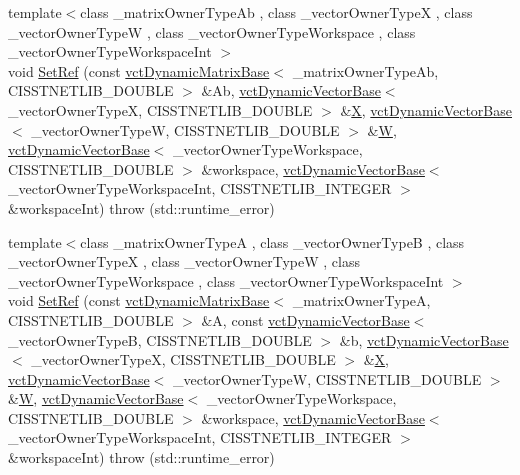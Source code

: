 {\bf }\par
\begin{DoxyCompactItemize}
\item 
{\footnotesize template$<$class \+\_\+matrix\+Owner\+Type\+Ab , class \+\_\+vector\+Owner\+Type\+X , class \+\_\+vector\+Owner\+Type\+W , class \+\_\+vector\+Owner\+Type\+Workspace , class \+\_\+vector\+Owner\+Type\+Workspace\+Int $>$ }\\void \hyperlink{classnmr_n_n_l_s_dynamic_data_ab32c899922b96030616bf83d5e741c55}{Set\+Ref} (const \hyperlink{classvct_dynamic_matrix_base}{vct\+Dynamic\+Matrix\+Base}$<$ \+\_\+matrix\+Owner\+Type\+Ab, C\+I\+S\+S\+T\+N\+E\+T\+L\+I\+B\+\_\+\+D\+O\+U\+B\+L\+E $>$ \&Ab, \hyperlink{classvct_dynamic_vector_base}{vct\+Dynamic\+Vector\+Base}$<$ \+\_\+vector\+Owner\+Type\+X, C\+I\+S\+S\+T\+N\+E\+T\+L\+I\+B\+\_\+\+D\+O\+U\+B\+L\+E $>$ \&\hyperlink{classnmr_n_n_l_s_dynamic_data_a2c67d4c5f9eff20ae015e60f85718f02}{X}, \hyperlink{classvct_dynamic_vector_base}{vct\+Dynamic\+Vector\+Base}$<$ \+\_\+vector\+Owner\+Type\+W, C\+I\+S\+S\+T\+N\+E\+T\+L\+I\+B\+\_\+\+D\+O\+U\+B\+L\+E $>$ \&\hyperlink{classnmr_n_n_l_s_dynamic_data_ae3204dc027313115b092088253dc4bb0}{W}, \hyperlink{classvct_dynamic_vector_base}{vct\+Dynamic\+Vector\+Base}$<$ \+\_\+vector\+Owner\+Type\+Workspace, C\+I\+S\+S\+T\+N\+E\+T\+L\+I\+B\+\_\+\+D\+O\+U\+B\+L\+E $>$ \&workspace, \hyperlink{classvct_dynamic_vector_base}{vct\+Dynamic\+Vector\+Base}$<$ \+\_\+vector\+Owner\+Type\+Workspace\+Int, C\+I\+S\+S\+T\+N\+E\+T\+L\+I\+B\+\_\+\+I\+N\+T\+E\+G\+E\+R $>$ \&workspace\+Int)  throw (std\+::runtime\+\_\+error)
\item 
{\footnotesize template$<$class \+\_\+matrix\+Owner\+Type\+A , class \+\_\+vector\+Owner\+Type\+B , class \+\_\+vector\+Owner\+Type\+X , class \+\_\+vector\+Owner\+Type\+W , class \+\_\+vector\+Owner\+Type\+Workspace , class \+\_\+vector\+Owner\+Type\+Workspace\+Int $>$ }\\void \hyperlink{classnmr_n_n_l_s_dynamic_data_a516a78c9781f58b7da602c8a4355fd97}{Set\+Ref} (const \hyperlink{classvct_dynamic_matrix_base}{vct\+Dynamic\+Matrix\+Base}$<$ \+\_\+matrix\+Owner\+Type\+A, C\+I\+S\+S\+T\+N\+E\+T\+L\+I\+B\+\_\+\+D\+O\+U\+B\+L\+E $>$ \&A, const \hyperlink{classvct_dynamic_vector_base}{vct\+Dynamic\+Vector\+Base}$<$ \+\_\+vector\+Owner\+Type\+B, C\+I\+S\+S\+T\+N\+E\+T\+L\+I\+B\+\_\+\+D\+O\+U\+B\+L\+E $>$ \&b, \hyperlink{classvct_dynamic_vector_base}{vct\+Dynamic\+Vector\+Base}$<$ \+\_\+vector\+Owner\+Type\+X, C\+I\+S\+S\+T\+N\+E\+T\+L\+I\+B\+\_\+\+D\+O\+U\+B\+L\+E $>$ \&\hyperlink{classnmr_n_n_l_s_dynamic_data_a2c67d4c5f9eff20ae015e60f85718f02}{X}, \hyperlink{classvct_dynamic_vector_base}{vct\+Dynamic\+Vector\+Base}$<$ \+\_\+vector\+Owner\+Type\+W, C\+I\+S\+S\+T\+N\+E\+T\+L\+I\+B\+\_\+\+D\+O\+U\+B\+L\+E $>$ \&\hyperlink{classnmr_n_n_l_s_dynamic_data_ae3204dc027313115b092088253dc4bb0}{W}, \hyperlink{classvct_dynamic_vector_base}{vct\+Dynamic\+Vector\+Base}$<$ \+\_\+vector\+Owner\+Type\+Workspace, C\+I\+S\+S\+T\+N\+E\+T\+L\+I\+B\+\_\+\+D\+O\+U\+B\+L\+E $>$ \&workspace, \hyperlink{classvct_dynamic_vector_base}{vct\+Dynamic\+Vector\+Base}$<$ \+\_\+vector\+Owner\+Type\+Workspace\+Int, C\+I\+S\+S\+T\+N\+E\+T\+L\+I\+B\+\_\+\+I\+N\+T\+E\+G\+E\+R $>$ \&workspace\+Int)  throw (std\+::runtime\+\_\+error)

\end{DoxyCompactItemize}
